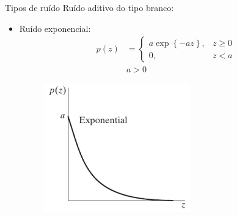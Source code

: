\begin{slide}[toc=]{Tipos de ruído}
Ruído aditivo do tipo branco:
		{
		\begin{itemize}
			\item Ruído exponencial:
				\begin{align*}
					p(z)&=\begin{cases}
						a\exp\left\{-az\right\}, & z\geq 0\\
						0, & z<a
					\end{cases}\\
					& a>0
				\end{align*}
				\begin{figure}[b!]
					\centering
					\includegraphics[width=0.6\textwidth]{figs/5-02d}
				\end{figure}
		\end{itemize}}
\end{slide}

